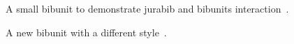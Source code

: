 \documentclass{article}
\begin{document}
\begin{bibunit}[jurabib]
    A small bibunit to demonstrate \textsf{jurabib} and \textsf{bibunits} interaction~\cite{helm72}.
    \putbib[jbtesthu]
\end{bibunit}

\begin{bibunit}[jureco]
    A new bibunit with a different style~\cite{helm82}.
    \putbib[jbtesthu]
\end{bibunit}
\end{document}
